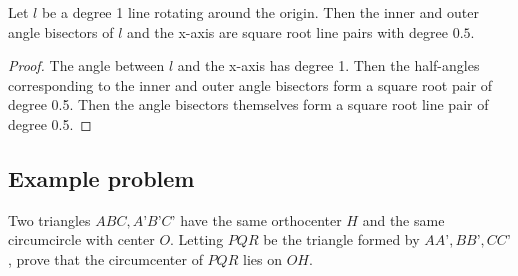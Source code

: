 \documentclass[a4paper]{article}
\begin{document}
\begin{example}
    Let $l$ be a degree 1 line rotating around the origin. Then the inner and outer angle bisectors of $l$ and the x-axis are square root line pairs with degree $0.5$.
    \begin{proof}
        The angle between $l$ and the x-axis has degree 1. Then the half-angles corresponding to the inner and outer angle bisectors form a square root pair of degree 0.5. Then the angle bisectors themselves form a square root line pair of degree 0.5. 
    \end{proof}
\end{example}



\subsection{Example problem}

\begin{exercise}[IMOSL 2022 G7]
    Two triangles $ABC, A’B’C’$ have the same orthocenter $H$ and the same circumcircle with center $O$. Letting $PQR$ be the triangle formed by $AA’, BB’, CC’$, prove that the circumcenter of $PQR$ lies on $OH$.
\end{exercise}
\end{document}
